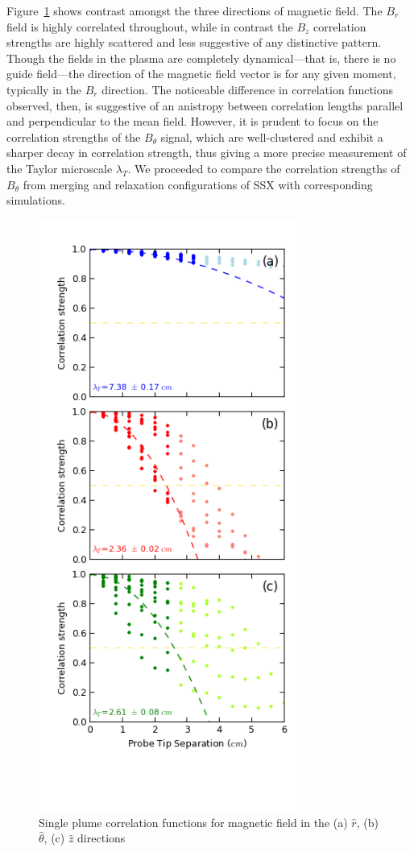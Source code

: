 \documentclass[aip,prl,amsmath,amssymb,reprint,superscriptaddress]{revtex4-1} %
\begin{document}
Figure~\ref{fig:brbtbz} shows contrast amongst the three directions of magnetic field. The $B_r$ field is highly correlated throughout, while in contrast the $B_z$ correlation strengths are highly scattered and less suggestive of any distinctive pattern. Though the fields in the plasma are completely dynamical---that is, there is no guide field---the direction of the magnetic field vector is for any given moment, typically in the $B_{r}$ direction. The noticeable difference in correlation functions observed, then, is suggestive of an anistropy between correlation lengths parallel and perpendicular to the mean field. However, it is prudent to focus on the correlation strengths of the $B_\theta$ signal, which are well-clustered and exhibit a sharper decay in correlation strength, thus giving a more precise measurement of the Taylor microscale $\lambda_T$. We proceeded to compare the correlation strengths of $B_\theta$ from merging and relaxation configurations of SSX with corresponding simulations. 

\begin{figure}[!htbp]
\centerline{
\includegraphics[width=8.5cm]{Images/brbtbz-081413.png}}
\caption{Single plume correlation functions for magnetic field in the (a) $\hat{r}$, (b) $\hat{\theta}$, (c) $\hat{z}$ directions}
\label{fig:brbtbz}
\end{figure}
\end{document}
